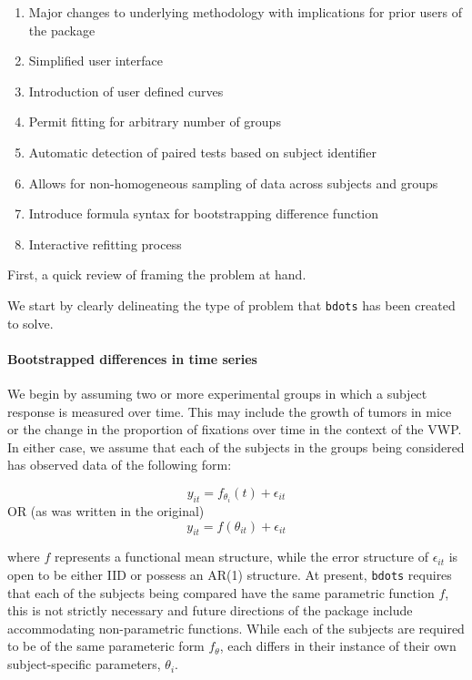 \documentclass{article}
\newcommand{\xt}{\texttt}%
\begin{document}
\begin{singlespace}
\begin{enumerate}
\item Major changes to underlying methodology with implications for prior users of the package
\item Simplified user interface
\item Introduction of user defined curves
\item Permit fitting for arbitrary number of groups
\item Automatic detection of paired tests based on subject identifier
\item Allows for non-homogeneous sampling of data across subjects and groups
\item Introduce formula syntax for bootstrapping difference function
\item Interactive refitting process
\end{enumerate}
\end{singlespace}

First, a quick review of framing the problem at hand.

We start by clearly delineating the type of problem that \xt{bdots} has been created to solve.

\paragraph{Bootstrapped differences in time series}

We begin by assuming two or more experimental groups in which a subject response is measured over time. This may include the growth of tumors in  mice or the change in the proportion of fixations over time in the context of the VWP. In either case, we assume that each of the subjects in the groups being considered has observed data of the following form:

\begin{equation}
y_{it} = f_{\theta_i}(t) + \epsilon_{it} 
\end{equation}
OR (as was written in the original)
\begin{equation}
y_{it} = f(\theta_{it}) + \epsilon_{it} 
\end{equation}

where $f$ represents a functional mean structure, while the error structure of $\epsilon_{it}$ is open to be either IID or possess an AR(1) structure. At present, \xt{bdots} requires that each of the subjects being compared have the same parametric function $f$, this is not strictly necessary and future directions of the package include accommodating non-parametric functions. While each of the subjects are required to be of the same parameteric form $f_{\theta}$, each differs in their instance of their own subject-specific parameters, $\theta_i$.
\end{document}
